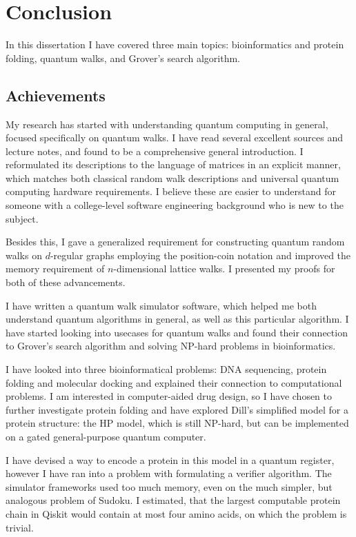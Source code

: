 \chapter{Conclusion}

In this dissertation I have covered three main topics: bioinformatics and protein folding, quantum walks, and Grover's search algorithm.

\section{Achievements}

My research has started with understanding quantum computing in general, focused specifically on quantum walks. I have read several excellent sources \cite{Aharonov, KempeIntroduction, Portugal, Santha, XiaReview} and lecture notes, and found \cite{Portugal} to be a comprehensive general introduction. I reformulated its descriptions to the language of matrices in an explicit manner, which matches both classical random walk descriptions and universal quantum computing hardware requirements. I believe these are easier to understand for someone with a college-level software engineering background who is new to the subject.

Besides this, I gave a generalized requirement for constructing quantum random walks on $d$-regular graphs employing the position-coin notation and improved the memory requirement of $n$-dimensional lattice walks. I presented my proofs for both of these advancements.

I have written a quantum walk simulator software, which helped me both understand quantum algorithms in general, as well as this particular algorithm. I have started looking into usecases for quantum walks and found their connection to Grover's search algorithm and solving NP-hard problems in bioinformatics.

I have looked into three bioinformatical problems: DNA sequencing, protein folding and molecular docking and explained their connection to computational problems. I am interested in computer-aided drug design, so I have chosen to further investigate protein folding and have explored Dill's simplified model for a protein structure: the HP model, which is still NP-hard, but can be implemented on a gated general-purpose quantum computer.

I have devised a way to encode a protein in this model in a quantum register, however I have ran into a problem with formulating a verifier algorithm. The simulator frameworks used too much memory, even on the much simpler, but analogous problem of Sudoku. I estimated, that the largest computable protein chain in Qiskit would contain at most four amino acids, on which the problem is trivial.


